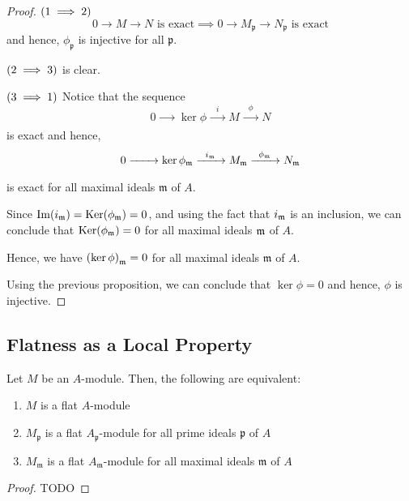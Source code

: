 \begin{proof}
	\(\left( 1 \implies 2 \right)\)
	\[
		0 \to M \to N \text{ is exact}
		\implies 0 \to M_\mathfrak{p} \to N_\mathfrak{p} \text{ is exact}
	\]
	and hence, \(\phi_\mathfrak{p}\) is injective for all \(\mathfrak{p}\).

	\(\left( 2 \implies 3 \right)\) is clear.

	\(\left( 3 \implies 1 \right)\)
	Notice that the sequence
	\[
		0 \xrightarrow[\quad\quad]{} \ker \phi
		\xrightarrow[\quad\quad]{i} M
		\xrightarrow[\quad\quad]{\phi} N
	\]
	is exact and hence,
	\[
		0 \xrightarrow[\quad\quad]{} \ker \phi_\mathfrak{m}
		\xrightarrow[\quad\quad]{i_{\mathfrak{m}}} M_\mathfrak{m}
		\xrightarrow[\quad\quad]{\phi_\mathfrak{m}} N_\mathfrak{m}
	\]
	is exact for all maximal ideals \(\mathfrak{m}\) of \(A\).

	Since \(\operatorname{Im}(i_{\mathfrak{m}}) = \operatorname{Ker}(\phi_{\mathfrak{m}}) = 0\), and using the
	fact that \(i_{\mathfrak{m}}\) is an inclusion, we can conclude that
	\(\operatorname{Ker}(\phi_{\mathfrak{m}}) = 0\) for all maximal ideals \(\mathfrak{m}\) of \(A\).

	Hence, we have \(\left( \ker \phi \right)_\mathfrak{m} = 0\) for
	all maximal ideals \(\mathfrak{m}\) of \(A\).

	Using the previous proposition, we can conclude that
	\(\ker \phi = 0\) and hence, \(\phi\) is injective.
\end{proof}


\subsection{Flatness as a Local Property}

\begin{proposition}{}{}
	Let \(M\) be an \(A\)-module.
	Then, the following are equivalent:
	\begin{enumerate}
		\item \(M\) is a flat \(A\)-module
		\item \(M_\mathfrak{p}\) is a flat \(A_\mathfrak{p}\)-module
			for all prime ideals \(\mathfrak{p}\) of \(A\)
		\item \(M_\mathfrak{m}\) is a flat \(A_\mathfrak{m}\)-module
			for all maximal ideals \(\mathfrak{m}\) of \(A\)
	\end{enumerate}
\end{proposition}

\begin{proof}
	TODO  %
\end{proof}


\pagebreak


